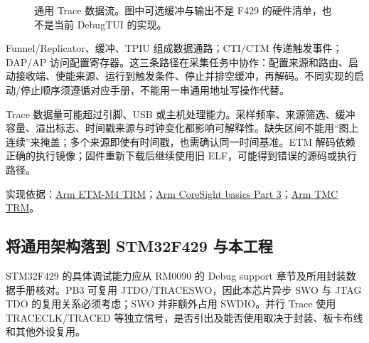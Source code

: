 \documentclass[UTF8,a4paper,11pt,oneside,fontset=none]{ctexart}
\newcommand{\src}[1]{\par\noindent\begin{minipage}{\linewidth}{\footnotesize\color{gray}实现依据：#1}\end{minipage}\par}
\begin{document}
\begin{figure}[H]\centering
{}
\caption{通用 Trace 数据流。图中可选缓冲与输出不是 F429 的硬件清单，也不是当前 DebugTUI 的实现。}
\end{figure}

Funnel/Replicator、缓冲、TPIU 组成数据通路；CTI/CTM 传递触发事件；DAP/AP 访问配置寄存器。这三条路径在采集任务中协作：配置来源和路由、启动接收端、使能来源、运行到触发条件、停止并排空缓冲，再解码。不同实现的启动/停止顺序须遵循对应手册，不能用一串通用地址写操作代替。

Trace 数据量可能超过引脚、USB 或主机处理能力。采样频率、来源筛选、缓冲容量、溢出标志、时间戳来源与时钟变化都影响可解释性。缺失区间不能用“图上连续”来掩盖；多个来源即使有时间戳，也需确认同一时间基准。ETM 解码依赖正确的执行镜像；固件重新下载后继续使用旧 ELF，可能得到错误的源码或执行路径。
\src{\href{https://documentation-service.arm.com/static/5e8ecc36c5ee7d4a00693f2f}{Arm ETM-M4 TRM}；\href{https://developer.arm.com/community/arm-community-blogs/b/architectures-and-processors-blog/posts/how-to-debug-coresight-basics-part-3}{Arm CoreSight basics Part 3}；\href{https://community.arm.com/cfs-file/__key/telligent-evolution-components-attachments/00-476-00-00-00-00-67-99/DDI0461B_5F00_tmc_5F00_r0p1_5F00_trm_2800_1_2900_.pdf}{Arm TMC TRM}。}

\subsection{将通用架构落到 STM32F429 与本工程}
STM32F429 的具体调试能力应从 RM0090 的 Debug support 章节及所用封装数据手册核对。PB3 可复用 JTDO/TRACESWO，因此本芯片异步 SWO 与 JTAG TDO 的复用关系必须考虑；SWO 并非额外占用 SWDIO。并行 Trace 使用 TRACECLK/TRACED 等独立信号，是否引出及能否使用取决于封装、板卡布线和其他外设复用。
\end{document}
